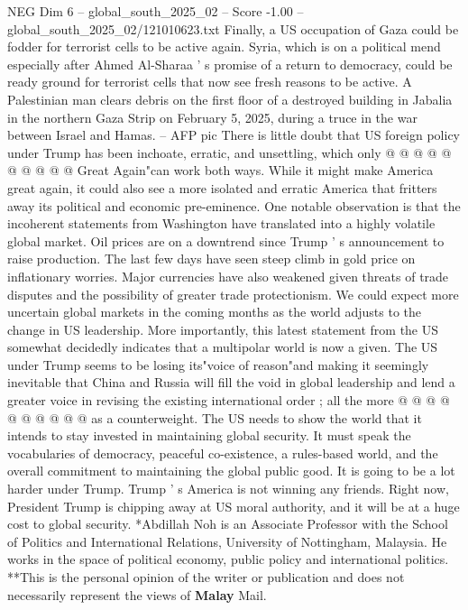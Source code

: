 \begin{textsample}{NEG Dim 6 – global\_south\_2025\_02 – Score -1.00 – global\_south\_2025\_02/121010623.txt}
Finally, a US occupation of Gaza could be fodder for terrorist cells to be active again.
Syria, which is on a political mend especially after Ahmed Al-Sharaa ' s promise of a return to democracy, could be ready ground for terrorist cells that now see fresh reasons to be active.
A Palestinian man clears debris on the first floor of a destroyed building in Jabalia in the northern Gaza Strip on February 5, 2025, during a truce in the war between Israel and Hamas. -- AFP pic There is little doubt that US foreign policy under Trump has been inchoate, erratic, and unsettling, which only @ @ @ @ @ @ @ @ @ @ Great Again"can work both ways.
While it might make America great again, it could also see a more isolated and erratic America that fritters away its political and economic pre-eminence.
One notable observation is that the incoherent statements from Washington have translated into a highly volatile global market.
Oil prices are on a downtrend since Trump ' s announcement to raise production.
The last few days have seen steep climb in gold price on inflationary worries.
Major currencies have also weakened given threats of trade disputes and the possibility of greater trade protectionism.
We could expect more uncertain global markets in the coming months as the world adjusts to the change in US leadership.
More importantly, this latest statement from the US somewhat decidedly indicates that a multipolar world is now a given.
The US under Trump seems to be losing its"voice of reason"and making it seemingly inevitable that China and Russia will fill the void in global leadership and lend a greater voice in revising the existing international order ; all the more @ @ @ @ @ @ @ @ @ @ as a counterweight.
The US needs to show the world that it intends to stay invested in maintaining global security.
It must speak the vocabularies of democracy, peaceful co-existence, a rules-based world, and the overall commitment to maintaining the global public good.
It is going to be a lot harder under Trump.
Trump ' s America is not winning any friends.
Right now, President Trump is chipping away at US moral authority, and it will be at a huge cost to global security. *Abdillah Noh is an Associate Professor with the School of Politics and International Relations, University of Nottingham, Malaysia.
He works in the space of political economy, public policy and international politics. **This is the personal opinion of the writer or publication and does not necessarily represent the views of \textbf{Malay} Mail.

\end{textsample}
